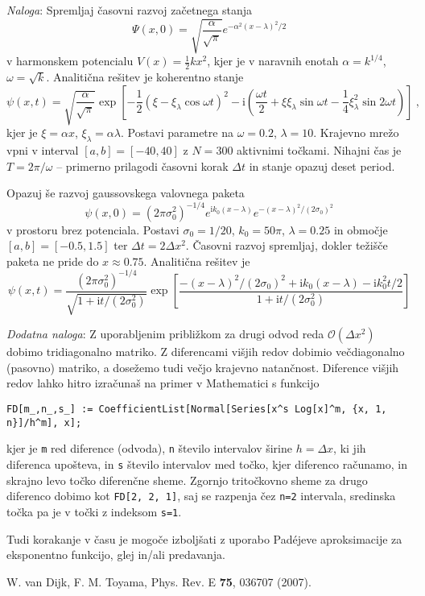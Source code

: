 \documentclass[slovene,11pt,a4paper]{article}
\newcommand{\ii}{\mathrm{i}}
\begin{document}
{\it Naloga\/}: Spremljaj časovni razvoj začetnega stanja
\begin{equation*}
  \Psi(x,0)=\sqrt{\frac{\alpha}{\sqrt{\pi}}} e^{-\alpha^2 (x-\lambda)^2/2}
\end{equation*}
v harmonskem potencialu $V(x)=\frac12 kx^2$, kjer je v naravnih enotah $\alpha=k^{1/4}$, $\omega=\sqrt{k}$. Analitična rešitev je koherentno stanje
\begin{equation*}
  \psi(x,t)=\sqrt{\frac{\alpha}{\sqrt{\pi}}} \exp\left[-\frac12 \left(\xi-\xi_\lambda \cos\omega t\right)^2 - \ii \left(\frac{\omega t}{2}+\xi\xi_\lambda \sin\omega t - \frac14 \xi_\lambda^2 \sin 2 \omega t\right)\right]\>,
\end{equation*}
kjer je $\xi=\alpha x$, $\xi_\lambda=\alpha \lambda$. Postavi parametre na $\omega=0.2$, $\lambda=10$. Krajevno mrežo vpni v interval $[a,b]=[-40,40]$ z $N=300$ aktivnimi točkami. Nihajni čas je $T=2\pi/\omega$ -- primerno prilagodi časovni korak $\Delta t$ in stanje opazuj deset period.

Opazuj še razvoj gaussovskega valovnega paketa
\begin{equation*}
  \psi(x,0)=(2\pi \sigma_0^2)^{-1/4} e^{\ii k_0(x-\lambda)}e^{-(x-\lambda)^2/(2\sigma_0)^2}
\end{equation*}
v prostoru brez potenciala. Postavi $\sigma_0=1/20$, $k_0=50\pi$, $\lambda=0.25$ in območje $[a,b]=[-0.5,1.5]$ ter $\Delta t=2\Delta x^2$. Časovni razvoj spremljaj, dokler težišče paketa ne pride do $x\approx 0.75$. Analitična rešitev je
\begin{equation*}
  \psi(x,t)=\frac{(2\pi \sigma_0^2)^{-1/4}}{\sqrt{1+\ii t/(2\sigma_0^2)}} \exp\left[
    \frac{-(x-\lambda)^2/(2\sigma_0)^2+\ii k_0(x-\lambda)-\ii k_0^2 t/2}{1+\ii t/(2\sigma_0^2)}
    \right]
\end{equation*}

{\it Dodatna naloga\/}: Z uporabljenim približkom za drugi odvod reda $\mathcal{O}(\Delta x^2)$ dobimo tridiagonalno matriko. Z diferencami višjih redov dobimio večdiagonalno (pasovno) matriko, a dosežemo tudi večjo krajevno natančnost. Diference višjih redov lahko hitro izračunaš na primer v Mathematici s funkcijo
\begin{center}
  \tt FD[m_,n_,s_] := CoefficientList[Normal[Series[x\string^s Log[x]\string^m, \{x, 1, n\}]/h\string^m], x];
\end{center}
kjer je {\tt m} red diference (odvoda), {\tt n} število intervalov širine $h=\Delta x$, ki jih diferenca upošteva, in {\tt s} število intervalov med točko, kjer diferenco računamo, in skrajno levo točko diferenčne sheme. Zgornjo tritočkovno sheme za drugo diferenco dobimo kot {\tt FD[2, 2, 1]}, saj se razpenja čez {\tt n=2} intervala, sredinska točka pa je v točki z indeksom {\tt s=1}.

Tudi korakanje v času je mogoče izboljšati z uporabo Pad\'ejeve aproksimacije za eksponentno funkcijo, glej \cite{dijk} in/ali predavanja.

\begin{thebibliography}{99}
\setlength{\itemsep}{.2\itemsep}\setlength{\parsep}{.5\parsep}
 W. van Dijk, F. M. Toyama, Phys. Rev. E {\bf 75}, 036707 (2007).
\end{thebibliography}
\end{document}
